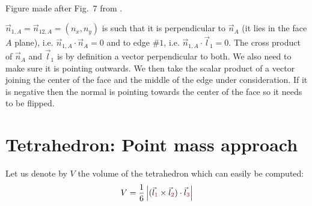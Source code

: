 \begin{center}
\\
{\captionfont Figure made after Fig.~7 from \textcite{wesc97}.}
\end{center}



$\vec{n}_{1,A}=\vec{n}_{12,A}=(n_x,n_y)$ is such that it is perpendicular to $\vec{n}_A$ 
(it lies in the face $A$ plane), i.e. $\vec{n}_{1,A}\cdot \vec{n}_A=0$ and to edge $\#1$, i.e. 
$\vec{n}_{1,A}\cdot \vec{l}_{1}=0$. The cross product of $\vec{n}_A$ and $\vec{l}_{1}$ is 
by definition a vector perpendicular to both.
We also need to make sure it is pointing outwards. We then take the scalar product of a 
vector joining the center of the face and the middle of the 
edge under consideration. If it is negative then the normal is pointing towards the center of the 
face so it needs to be flipped.




\section*{Tetrahedron: Point mass approach}

Let us denote by $V$ the volume of the tetrahedron which 
can easily be computed:
\begin{equation}
V=\frac16 \left| (\vec{l}_{\color{purple}1} \times \vec{l}_{\color{purple}2}) \cdot \vec{l}_{\color{purple}3}\right|
\label{eq:tet:vol}
\end{equation}

